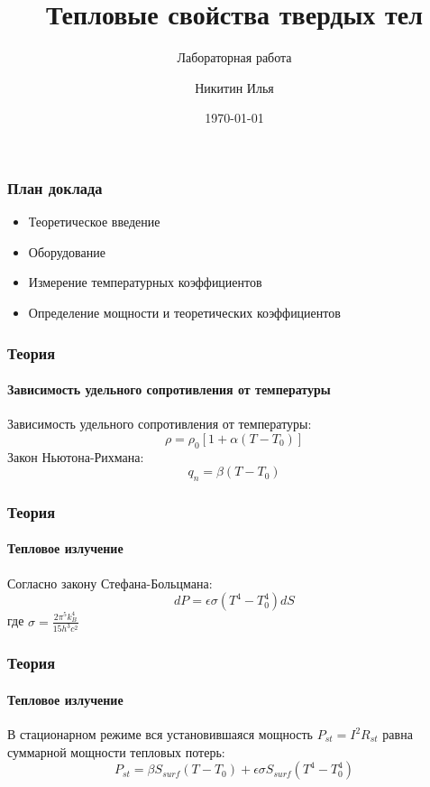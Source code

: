\documentclass[8pt,pdf,hyperref={unicode}]{beamer}
\title{Тепловые свойства твердых тел}
\subtitle{Лабораторная работа}
\author{Никитин Илья}
\date{\today}
\begin{document}
	
	\maketitle
	
\begin{frame}
	\frametitle{План доклада}
	\begin{center}
		\begin{itemize}
			\item Теоретическое введение
			\item Оборудование
			\item Измерение температурных коэффициентов
			\item Определение мощности и теоретических коэффициентов
		\end{itemize}
	\end{center}
\end{frame}
\begin{frame}
	\frametitle{Теория}
	\framesubtitle{Зависимость удельного сопротивления от температуры}
	\begin{center}
		Зависимость удельного сопротивления от температуры:
		\begin{equation}
		\rho = \rho_0 [1 + \alpha(T - T_0)]
		\end{equation}
		Закон Ньютона-Рихмана:
		\begin{equation}
		q_n = \beta (T - T_0)
		\end{equation}
	\end{center}
\end{frame}
\begin{frame}
	\frametitle{Теория}
	\framesubtitle{Тепловое излучение}
	\begin{center}
	Согласно закону Стефана-Больцмана:
\begin{equation}
dP = \epsilon \sigma (T^4 - T^4_0)dS
\end{equation}
где $\sigma = \frac{2 \pi^5 k^4_B}{15h^3c^2}$	
	\end{center}
\end{frame}
\begin{frame}
	\frametitle{Теория}
	\framesubtitle{Тепловое излучение}
	\begin{center}
	В стационарном режиме вся установившаяся мощность $P_{st} = I^2 R_{st}$ равна суммарной мощности тепловых потерь:
	\begin{equation}
	P_{st} = \beta S_{surf} (T - T_0) + \epsilon \sigma S_{surf} (T^4 - T^4_0)
	\end{equation}			
	\end{center}
\end{frame}
\end{document}
